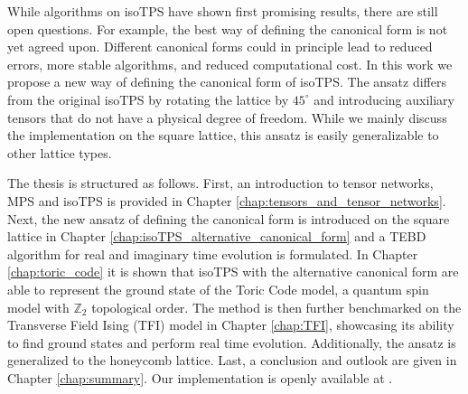 While algorithms on isoTPS have shown first promising results, there are still open questions. For example, the best way of defining the canonical form is not yet agreed upon. Different canonical forms could in principle lead to reduced errors, more stable algorithms, and reduced computational cost. In this work we propose a new way of defining the canonical form of isoTPS. The ansatz differs from the original isoTPS by rotating the lattice by $45^\circ$ and introducing auxiliary tensors that do not have a physical degree of freedom. While we mainly discuss the implementation on the square lattice, this ansatz is easily generalizable to other lattice types.
\par
The thesis is structured as follows. First, an introduction to tensor networks, MPS and isoTPS is provided in Chapter \ref{chap:tensors_and_tensor_networks}. Next, the new ansatz of defining the canonical form is introduced on the square lattice in Chapter \ref{chap:isoTPS_alternative_canonical_form} and a TEBD algorithm for real and imaginary time evolution is formulated. In Chapter \ref{chap:toric_code} it is shown that isoTPS with the alternative canonical form are able to represent the ground state of the Toric Code model, a quantum spin model with $\mathbb{Z}_2$ topological order. The method is then further benchmarked on the Transverse Field Ising (TFI) model in Chapter \ref{chap:TFI}, showcasing its ability to find ground states and perform real time evolution. Additionally, the ansatz is generalized to the honeycomb lattice. Last, a conclusion and outlook are given in Chapter \ref{chap:summary}. Our implementation is openly available at \cite{cite:github_YB_isoTPS}.